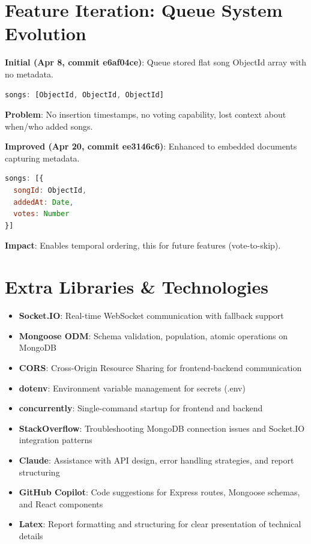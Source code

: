 \documentclass[11pt,a4paper]{article}
\begin{document}
\section{Feature Iteration: Queue System Evolution}

\textbf{Initial (Apr 8, commit e6af04ce)}: Queue stored flat song ObjectId array with no metadata.
\begin{lstlisting}[language=javascript]
songs: [ObjectId, ObjectId, ObjectId]
\end{lstlisting}

\textbf{Problem}: No insertion timestamps, no voting capability, lost context about when/who added songs.

\textbf{Improved (Apr 20, commit ee3146c6)}: Enhanced to embedded documents capturing metadata.
\begin{lstlisting}[language=javascript]
songs: [{
  songId: ObjectId,
  addedAt: Date,
  votes: Number
}]
\end{lstlisting}

\textbf{Impact}: Enables temporal ordering, this for future features (vote-to-skip).

\section{Extra Libraries \& Technologies}

\begin{itemize}
    \item \textbf{Socket.IO}: Real-time WebSocket communication with fallback support
    \item \textbf{Mongoose ODM}: Schema validation, population, atomic operations on MongoDB
    \item \textbf{CORS}: Cross-Origin Resource Sharing for frontend-backend communication
    \item \textbf{dotenv}: Environment variable management for secrets (.env)
    \item \textbf{concurrently}: Single-command startup for frontend and backend
    \item \textbf{StackOverflow}: Troubleshooting MongoDB connection issues and Socket.IO integration patterns
    \item \textbf{Claude}: Assistance with API design, error handling strategies, and report structuring
    \item \textbf{GitHub Copilot}: Code suggestions for Express routes, Mongoose schemas, and React components
    \item \textbf{Latex}: Report formatting and structuring for clear presentation of technical details
\end{itemize}
\end{document}
